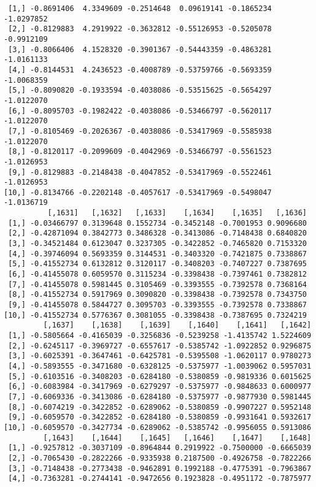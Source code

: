 \documentclass[
  letterpaper,
  DIV=11,
  numbers=noendperiod]{scrreprt}
\begin{document}
\begin{verbatim}
 [1,] -0.8691406  4.3349609 -0.2514648  0.09619141 -0.1865234 -1.0297852
 [2,] -0.8129883  4.2919922 -0.3632812 -0.55126953 -0.5205078 -0.9912109
 [3,] -0.8066406  4.1528320 -0.3901367 -0.54443359 -0.4863281 -1.0161133
 [4,] -0.8144531  4.2436523 -0.4008789 -0.53759766 -0.5693359 -1.0068359
 [5,] -0.8090820 -0.1933594 -0.4038086 -0.53515625 -0.5654297 -1.0122070
 [6,] -0.8095703 -0.1982422 -0.4038086 -0.53466797 -0.5620117 -1.0122070
 [7,] -0.8105469 -0.2026367 -0.4038086 -0.53417969 -0.5585938 -1.0122070
 [8,] -0.8120117 -0.2099609 -0.4042969 -0.53466797 -0.5561523 -1.0126953
 [9,] -0.8129883 -0.2148438 -0.4047852 -0.53417969 -0.5522461 -1.0126953
[10,] -0.8134766 -0.2202148 -0.4057617 -0.53417969 -0.5498047 -1.0136719
          [,1631]   [,1632]   [,1633]    [,1634]    [,1635]   [,1636]
 [1,] -0.03466797 0.3139648 0.1552734 -0.3452148 -0.7001953 0.9096680
 [2,] -0.42871094 0.3842773 0.3486328 -0.3413086 -0.7148438 0.6840820
 [3,] -0.34521484 0.6123047 0.3237305 -0.3422852 -0.7465820 0.7153320
 [4,] -0.39746094 0.5693359 0.3144531 -0.3403320 -0.7421875 0.7338867
 [5,] -0.41552734 0.6132812 0.3120117 -0.3408203 -0.7407227 0.7387695
 [6,] -0.41455078 0.6059570 0.3115234 -0.3398438 -0.7397461 0.7382812
 [7,] -0.41455078 0.5981445 0.3105469 -0.3393555 -0.7392578 0.7368164
 [8,] -0.41552734 0.5917969 0.3090820 -0.3398438 -0.7392578 0.7343750
 [9,] -0.41455078 0.5844727 0.3095703 -0.3393555 -0.7392578 0.7338867
[10,] -0.41552734 0.5776367 0.3081055 -0.3398438 -0.7387695 0.7324219
         [,1637]    [,1638]    [,1639]    [,1640]    [,1641]   [,1642]
 [1,] -0.5805664 -0.4165039 -0.3256836 -0.5239258 -1.4135742 1.5224609
 [2,] -0.6245117 -0.3969727 -0.6557617 -0.5385742 -1.0922852 0.9296875
 [3,] -0.6025391 -0.3647461 -0.6425781 -0.5395508 -1.0620117 0.9780273
 [4,] -0.5893555 -0.3471680 -0.6328125 -0.5375977 -1.0039062 0.5957031
 [5,] -0.6103516 -0.3408203 -0.6284180 -0.5380859 -0.9819336 0.6015625
 [6,] -0.6083984 -0.3417969 -0.6279297 -0.5375977 -0.9848633 0.6000977
 [7,] -0.6069336 -0.3413086 -0.6284180 -0.5375977 -0.9877930 0.5981445
 [8,] -0.6074219 -0.3422852 -0.6289062 -0.5380859 -0.9907227 0.5952148
 [9,] -0.6059570 -0.3422852 -0.6284180 -0.5380859 -0.9931641 0.5932617
[10,] -0.6059570 -0.3427734 -0.6289062 -0.5385742 -0.9956055 0.5913086
         [,1643]    [,1644]    [,1645]   [,1646]    [,1647]    [,1648]
 [1,] -0.9257812 -0.3037109 -0.8964844 0.2919922 -0.7500000 -0.6665039
 [2,] -0.7065430 -0.2822266 -0.9335938 0.2187500 -0.4926758 -0.7822266
 [3,] -0.7148438 -0.2773438 -0.9462891 0.1992188 -0.4775391 -0.7963867
 [4,] -0.7363281 -0.2744141 -0.9472656 0.1923828 -0.4951172 -0.7875977

\end{verbatim}
\end{document}
